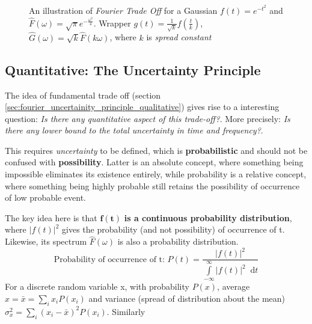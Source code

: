 \documentclass[11pt, a4paper]{article}
\newcommand{\quotedsingle}[1]{#1}	%
\newcommand{\quotedsingleit}[1]{\quotedsingle{\textit{#1}}}	%
\newcommand{\variance}[1]{\sigma_{#1}^{2}}
\newcommand{\diff}{\mathop{}\!\mathrm{d}}
\newcommand{\dt}{\diff t}
\newcommand{\dint}[2]{\int \limits_{#1}^{#2}}  %
\newcommand{\intinfty}{\dint{-\infty}{\infty}}	%
\begin{document}
\begin{figure}[H]
		\caption{An illustration of \textit{Fourier Trade Off} for a Gaussian $f(t) = e^{-t^2}$ and $\hat{F}(\omega) = \sqrt{\pi} e^{-\frac{\omega^2}{4}}$. Wrapper $g(t)=\frac{1}{\sqrt{k}} f \left( \frac{t}{k} \right)$, $\hat{G}(\omega) = \sqrt{k} \hat{F}(k \omega)$, where $k$ is \textit{spread constant}}
		
		\label{fig:fourier_tradeoff}  %
	\end{figure}
	
	\subsection{Quantitative: The Uncertainty Principle}
	The idea of fundamental trade off (section \ref{sec:fourier_uncertainity_principle_qualitative}) gives rise to a interesting question: \textit{Is there any quantitative aspect of this trade-off?}. More precisely: \textit{Is there any lower bound to the total uncertainty in time and frequency?}.
	
	This requires \quotedsingleit{uncertainty} to be defined, which is \textbf{probabilistic} and should not be confused with \textbf{possibility}. Latter is an absolute concept, where something being impossible eliminates its existence entirely, while probability is a relative concept, where something being highly probable still retains the possibility of occurrence of low probable event.
	
	The key idea here is that $\boldsymbol{f(t)}$ \textbf{is a continuous probability distribution}, where $|f(t)|^{2}$ gives the probability (and not possibility) of occurrence of t. Likewise, its spectrum $\hat{F}(\omega)$ is also a probability distribution.
	\begin{equation*}
		\text{Probability of occurrence of t: }P(t) = \frac{|f(t)|^{2}}{\intinfty |f(t)|^{2} \dt}
	\end{equation*}
	For a discrete random variable x, with probability $P(x)$, average $x = \bar{x} = \sum \limits_{i} x_{i} P(x_{i})$ and variance (spread of distribution about the mean) $ \variance{x} = \sum \limits_{i} (x_{i} - \bar{x})^{2} P(x_{i})$. Similarly
	
\end{document}
